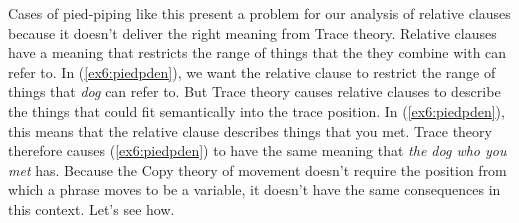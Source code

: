 Cases of pied-piping like this present a problem for our analysis of relative clauses because it doesn't deliver the right meaning from Trace theory. Relative clauses have a meaning that restricts the range of things that the  they combine with can refer to. In (\ref{ex6:piedpden}), we want the relative clause to restrict the range of things that \emph{dog} can refer to. But Trace theory causes relative clauses to describe the things that could fit semantically into the trace position. In (\ref{ex6:piedpden}), this means that the relative clause describes things that you met. Trace theory therefore causes (\ref{ex6:piedpden}) to have the same meaning that \emph{the dog who you met} has. Because the Copy theory of movement doesn't require the position from which a phrase moves to be a variable, it doesn't have the same consequences in this context. Let's see how.

